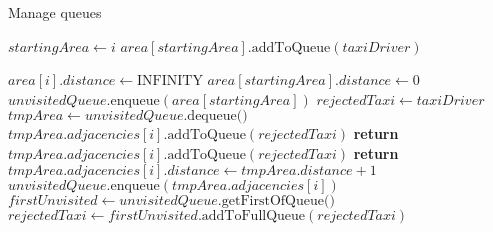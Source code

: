 			
			\begin{algorithm}
				\caption{Manage queues}
				\begin{algorithmic}[1]
							\State $ startingArea \gets i $
						\EndIf
					\EndFor
						\State $ area[startingArea].\text{addToQueue}(taxiDriver)$
					
					\Else
							\State $area[i].distance \gets \text{INFINITY} $
						\EndFor
						\State $area[startingArea].distance \gets 0$
						\State $ unvisitedQueue.\text{enqueue}(area[startingArea])$
						\State $ rejectedTaxi \gets taxiDriver$
							\State $ tmpArea \gets unvisitedQueue.\text{dequeue()} $
									\State $tmpArea.adjacencies[i].\text{addToQueue}(rejectedTaxi)$
									\State \textbf{return} 
								\EndIf
							\EndFor
									\State $tmpArea.adjacencies[i].\text{addToQueue}(rejectedTaxi)$
									\State \textbf{return} 
								\EndIf
									\State $tmpArea.adjacencies[i].distance \gets tmpArea.distance + 1$
									\State $ unvisitedQueue.\text{enqueue}(tmpArea.adjacencies[i])$
								\EndIf
							\EndFor
							\State $firstUnvisited \gets unvisitedQueue.\text{getFirstOfQueue()}$
							\State $rejectedTaxi \gets firstUnvisited.\text{addToFullQueue}(rejectedTaxi)$
						\EndWhile
					
					
					\EndIf
					\EndProcedure
				\end{algorithmic}
			\end{algorithm}
		
	
	
	
%